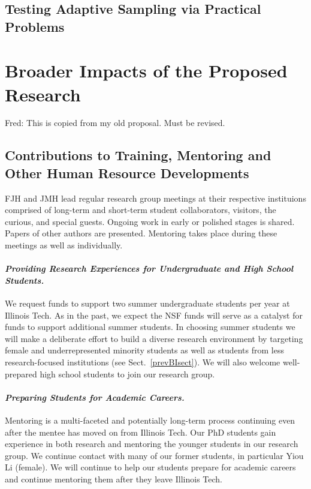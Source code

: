 \documentclass[11pt]{NSFamsart}
\newcommand{\fredparagraph}[1]{\paragraph*{\emph{#1}}}
\newcommand{\FJHNote}[1]{{\color{blue}Fred: #1}}
\begin{document}
\subsection{Testing Adaptive Sampling via Practical Problems} \label{sec:TestBed}



\section{Broader Impacts of the Proposed Research}\label{SectBroad}
\FJHNote{This is copied from my old proposal.  Must be revised.}


\subsection{Contributions to Training, Mentoring and Other Human Resource Developments}
FJH and JMH lead regular research group meetings at their respective instituions comprised of long-term and short-term student 
collaborators, visitors, the curious, and special guests.  Ongoing work in early or polished stages is shared.  Papers of other authors are presented.  Mentoring takes place during these meetings as well as individually.

\fredparagraph{Providing Research Experiences for Undergraduate and High School Students.} We request funds 
to 
support two summer undergraduate students per year at Illinois Tech. As in the past, we expect the NSF funds will serve as a catalyst for funds to 
support additional summer students. In choosing summer students we will make a deliberate effort to 
build 
a diverse research environment by targeting female and underrepresented minority students as well 
as students from less research-focused institutions (see Sect.~\ref{prevBIsect}). We will also 
welcome well-prepared high school students to join our research group.

\fredparagraph{Preparing Students for Academic Careers.} Mentoring is a multi-faceted and 
potentially long-term process continuing even after the mentee has moved on from Illinois Tech.  
Our PhD students gain experience in both research and mentoring the younger students in our 
research group.  We 
continue contact with many of our former students, in particular Yiou Li (female).  We will continue to help our students prepare for 
academic careers and continue mentoring them after they leave Illinois Tech.
\end{document}
